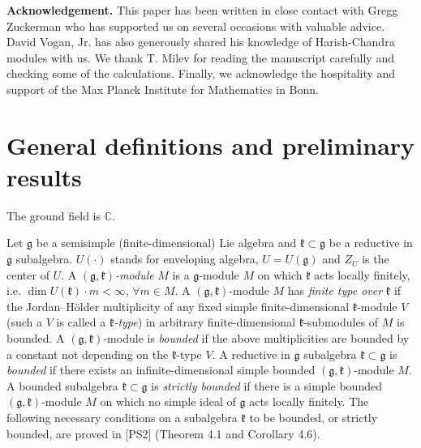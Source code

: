 \documentclass[12pt]{amsart}
\theoremstyle{plain} %
\newcommand {\CC} {\mathbb {C}}
\newcommand{\kk}{\mathfrak{k}}
\renewcommand{\gg}{\mathfrak{g}}
\begin{document}
\textbf{Acknowledgement.} This paper has been written in close contact
with Gregg Zuckerman who has supported us on several occasions with
valuable advice. David Vogan, Jr. has also generously shared his
knowledge of Harish-Chandra modules with us. We thank T. Milev for
reading the manuscript carefully and checking some of the
calculations. Finally, we acknowledge the hospitality and support of the Max Planck Institute for Mathematics in Bonn.

\section{General definitions and preliminary results}

The ground field is $\CC$. 

Let $\gg$ be a semisimple (finite-dimensional) Lie algebra and
$\kk\subset\gg$ be a reductive in $\gg$ subalgebra. $U(\cdotp)$ stands
for enveloping algebra, $U=U(\gg)$ and $Z_U$ is the center of $U$. A $(\gg, \kk)$\textit{-module}  $M$ is a $\gg$-module  $M$ on which $\kk$ acts locally finitely, i.e. $\dim U(\kk) \cdotp m <\infty$, $\forall m\in M$. A $(\gg, \kk)$-module $M$ has \textit{finite type over} $\kk$ if the Jordan--H\"{o}lder multiplicity of any fixed simple finite-dimensional $\kk$-module $V$ (such a $V$ is called a $\kk$\textit{-type}) in arbitrary finite-dimensional $\kk$-submodules of $M$ is bounded. A $(\gg, \kk)$-module is \textit{bounded} if the above multiplicities are bounded by a constant not depending on the $\kk$-type $V$. A reductive in $\gg$ subalgebra $\kk\subset \gg$ is \textit{bounded} if there exists an infinite-dimensional simple bounded $(\gg, \kk)$-module $M$.
A bounded subalgebra $\kk\subset\gg$ is \textit{strictly bounded} if there is a simple bounded $(\gg,\kk)$-module $M$ on which no simple ideal of $\gg$ acts locally finitely. The following necessary conditions on a subalgebra $\kk$ to be bounded, or strictly bounded, are proved in [PS2] (Theorem 4.1 and Corollary 4.6).
\end{document}
